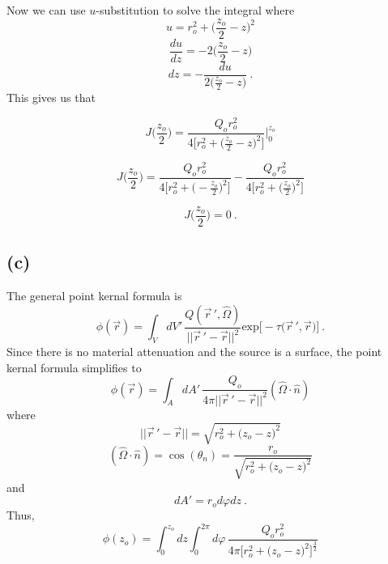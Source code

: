 \documentclass{article}
\begin{document}
Now we can use $u$-substitution to solve the integral where
\begin{equation*}
u = r_o^2 + \big(\frac{z_o}{2}-z \big)^2
\end{equation*}
\begin{equation*}
\frac{du}{dz} = -2 \big(\frac{z_o}{2}-z \big)
\end{equation*}
\begin{equation*}
dz = - \frac{du}{2 \big(\frac{z_o}{2}-z \big)} \: .
\end{equation*}
This gives us that

\begin{equation*}
J\Big(\frac{z_o}{2}\Big) = \frac{Q_o r_o^2}{4 \Big[ r_o^2 + \big(\frac{z_o}{2}-z\big)^2 \Big]} \Big|_0^{z_o}
\end{equation*}

\begin{equation*}
J\Big(\frac{z_o}{2}\Big) = \frac{Q_o r_o^2}{4 \Big[ r_o^2 + \big(-\frac{z_o}{2}\big)^2 \Big]} - \frac{Q_o r_o^2}{4 \Big[ r_o^2 + \big(\frac{z_o}{2}\big)^2 \Big]} 
\end{equation*}

\begin{equation*}
\boxed{ J\Big(\frac{z_o}{2}\Big) = 0 } \: .
\end{equation*}

\pagebreak

\subsection*{(c)}

The general point kernal formula is 
\begin{equation*}
\phi(\vec{r}) = \int_V dV' \, \frac{Q(\vec{r}\,',\hat{\Omega})}{||\vec{r}\,'-\vec{r}||^2} \text{exp} \Big[ - \tau \big(\vec{r}\,', \vec{r} \big) \Big] \: .
\end{equation*}
Since there is no material attenuation and the source is a surface, the point kernal formula simplifies to  
\begin{equation}
\phi(\vec{r}) = \int_A dA' \, \frac{Q_o}{4 \pi ||\vec{r}\,'-\vec{r}||^2} (\hat{\Omega} \cdot \hat{n})
\end{equation}
where 
\begin{equation*}
||\vec{r}\,'-\vec{r}|| =  \sqrt{  r_o^2 + \big(z_o-z\big)^2 } 
\end{equation*}
\begin{equation*}
(\hat{\Omega} \cdot \hat{n}) = \cos(\theta_n) = \frac{r_o}{\sqrt{ r_o^2 + \big(z_o-z\big)^2 } }
\end{equation*}
and
\begin{equation*}
dA' = r_o d\varphi dz \: .
\end{equation*}
Thus,
\begin{equation*}
\phi(z_o) =\int_0^{z_o} dz \int_0^{2\pi} d\varphi \, \frac{Q_o r_o^2}{4 \pi \Big[ r_o^2 + \big(z_o-z\big)^2 \Big]^{\frac{3}{2}}} 
\end{equation*}
\end{document}
